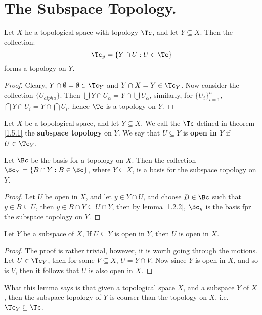 
\section{The Subspace Topology.}

\begin{theorem}\label{1.5.1}
    Let $X$ he a topological space with topology $\Tc$, and let $Y \subseteq X$. Then the 
    collection:
        \begin{equation*}
            \Tc_y = \{Y \cap U: U \in \Tc\}
        \end{equation*}
    forms a topology on $Y$.
\end{theorem}
\begin{proof}
    Cleary, $Y \cap \emptyset=\emptyset \in \Tc_Y$ and  $Y \cap X=Y \in \Tc_Y$. Now  consider the collection 
    $\{U_{alpha}\}$. Then  $\bigcup{Y \cap U_{\alpha}}=Y \cap \bigcup{U_{\alpha}}$, similarly, for  $\{U_i\}_{i=1}^n$, 
    $\bigcap{Y \cap U_i}=Y \cap \bigcap{U_i}$, hence  $\Tc$ is a topology on  $Y$.
\end{proof}

\begin{definition}
    Let $X$ be a topological space, and let  $Y \subseteq X$. We call the $\Tc$ defined 
    in theorem \ref{1.5.1} the \textbf{subspace topology} on $Y$. We say that $U \subseteq Y$ is 
    \textbf{open in $Y$} if $U \in \Tc_Y$.
\end{definition}

\begin{lemma}\label{1.5.2}
    Let $\Bc$ be the basis for a topology on  $X$. Then the collection  $\Bc_Y=\{B \cap Y: B \in \Bc\}$, 
    where  $Y \subseteq X$, is a basis for the subspace topology on  $Y$.
\end{lemma}
\begin{proof}
    Let $U$ be open in  $X$, and let  $y \in Y \cap U$, and choose  $B \in \Bc$ such that 
    $y \in B \subseteq U$, then  $y \in B \cap Y \subseteq U \cap Y$, then by lemma \ref{1.2.2}, 
     $\Bc_y$ is the basis fpr the subspace topology on  $Y$.
\end{proof}

\begin{lemma}\label{1.5.3}
    Let $Y$ be a subspace of  $X$, If  $U \subseteq Y$ is open in  $Y$, then  $U$ is 
    open in  $X$.
\end{lemma}
\begin{proof}
    The proof is rather trivial, however, it is worth going through the motions.
    Let $U \in \Tc_Y$, then for some  $V \subseteq X$,  $U=Y \cap V$. Now since  $Y$ is open in  $X$, and so 
    is  $V$, then  it follows that $U$ is also open in  $X$.
\end{proof}
\begin{remark}
    What this lemma says is that given a topological space $X$, and a subspace  $Y$ of  $X$, then the 
    subspace topology of  $Y$ is courser than the topology on  $X$, i.e.  $\Tc_Y \subseteq \Tc$.
\end{remark}

